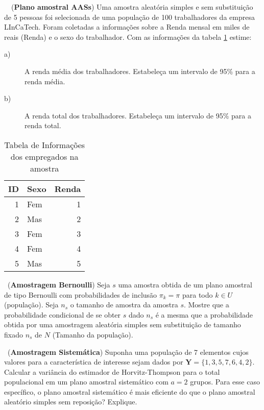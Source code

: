 \documentclass[a4paper,11pt,oneside,onecolumn]{Config/milktest}
\begin{document}
	
	\medskip 
	\question~~({\bf Plano amostral AASs}) Uma amostra aleatória simples e sem substituição de 5 pessoas foi selecionada de uma população de 100 trabalhadores da empresa LInCaTech. Foram coletadas a informações sobre a Renda mensal em miles de reais (Renda) e o sexo do trabalhador. Com as informações da tabela \ref{ID:Renda} estime:
	
	\begin{description}
		\item[a)] A renda média dos trabalhadores. Estabeleça um intervalo de 95\% para a renda média.
		\item[b)] A renda total dos trabalhadores. Estabeleça um intervalo de 95\% para a renda total. 
	\end{description}
	{\small \begin{table}[H]
			\centering
			\begin{tabular}{rlr}
				\hline
				ID & Sexo & Renda  \\ 
				\hline
				1 & Fem &  1 \\
				2 & Mas &  2\\
				3 & Fem &  3\\
				4 & Fem &  4\\
				5 & Mas &  5\\
				
				\hline
			\end{tabular}
			\caption{Tabela de Informações dos empregados na amostra} 
			\label{ID:Renda}
		\end{table}
	}
	
	
	
	
	\medskip 
	\question~({\bf Amostragem Bernoulli}) Seja $s$ uma amostra obtida de um plano amostral de tipo Bernoulli com probabilidades de inclusão $\pi_k = \pi$ para todo $k \in U$ (população). Seja $n_s$ o tamanho de amostra da amostra $s.$ Mostre que a probabilidade condicional de se obter $s$ dado $n_s$ é a mesma que a probabilidade obtida por uma amostragem aleatória simples sem substituição de tamanho fixado $n_s$ de $N$ (Tamanho da população). 
	
	
	
	\medskip
	\question~({\bf Amostragem Sistemática}) Suponha uma população de 7 elementos cujos valores para a característica de interesse sejam dados por
	$\mathbf{Y} = \{1, 3, 5, 7, 6, 4, 2\}.$ Calcular a variância do estimador de Horvitz-Thompson para o total populacional em um plano amostral sistemático com $a = 2$ grupos. Para esse caso específico, o plano amostral sistemático é mais eficiente do que o plano amostral aleatório simples sem reposição? Explique.
	
\end{document}
